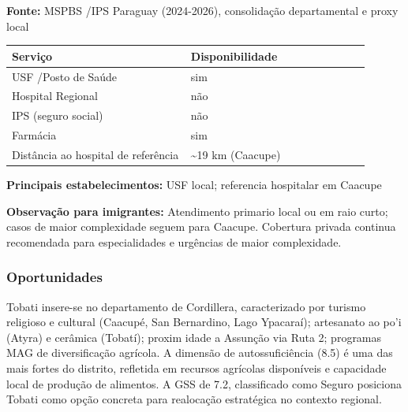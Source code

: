\textbf{Fonte:} MSPBS /\allowbreak  IPS Paraguay (2024-2026), consolidação
departamental e proxy local

{\def\LTcaptype{none} %
\begin{longtable}{@{}>{\raggedright\arraybackslash}p{0.45\linewidth} >{\raggedright\arraybackslash}p{0.45\linewidth}@{}}
\toprule\noalign{}
Serviço & Disponibilidade \\
\midrule\noalign{}
\endhead
\bottomrule\noalign{}
\endlastfoot
USF /\allowbreak  Posto de Saúde & sim \\
Hospital Regional & não \\
IPS (seguro social) & não \\
Farmácia & sim \\
Distância ao hospital de referência & \textasciitilde19 km (Caacupe) \\
\end{longtable}
}

\textbf{Principais estabelecimentos:} USF local; referencia hospitalar
em Caacupe

\textbf{Observação para imigrantes:} Atendimento primario local ou em
raio curto; casos de maior complexidade seguem para Caacupe. Cobertura
privada continua recomendada para especialidades e urgências de maior
complexidade.
\newpage

\subsubsection*{Oportunidades}\label{oport-tobati-0318}
Tobati insere-se no departamento de Cordillera, caracterizado por turismo religioso e cultural (Caacupé, San Bernardino, Lago Ypacaraí); artesanato ao po'i (Atyra) e cerâmica (Tobatí); proxim idade a Assunção via Ruta 2; programas MAG de diversificação agrícola. A dimensão de autossuficiência (8.5) é uma das mais fortes do distrito, refletida em recursos agrícolas disponíveis e capacidade local de produção de alimentos. A GSS de 7.2, classificado como Seguro posiciona Tobati como opção concreta para realocação estratégica no contexto regional.

